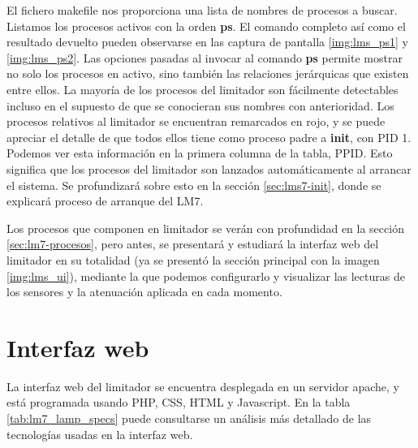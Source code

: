 El fichero \gls{makefile} nos proporciona una lista de nombres de procesos a buscar. Listamos los procesos activos con la orden \textbf{ps}. El comando completo así como el resultado devuelto pueden observarse en las captura de pantalla \ref{img:lms_ps1} y \ref{img:lms_ps2}. Las opciones pasadas al invocar al comando \textbf{ps} permite mostrar no solo los procesos en activo, sino también las relaciones jerárquicas que existen entre ellos. La mayoría de los procesos del limitador son fácilmente detectables incluso en el supuesto de que se conocieran sus nombres con anterioridad. Los procesos relativos al limitador se encuentran remarcados en rojo, y se puede apreciar el detalle de que todos ellos tiene como proceso padre  a \textbf{init}, con \acrshort{PID} 1. Podemos ver esta información en la primera columna de la tabla, \acrshort{PPID}. Esto significa que los procesos del limitador son lanzados automáticamente al arrancar el sistema. Se profundizará sobre esto en la sección \ref{sec:lms7-init}, donde se explicará proceso de arranque del LM7.

Los procesos que componen en limitador se verán con profundidad en la sección \ref{sec:lm7-procesos}, pero antes, se presentará y estudiará la interfaz web del limitador en su totalidad (ya se presentó la sección principal con la imagen \ref{img:lms_ui}), mediante la que podemos configurarlo y visualizar las lecturas de los sensores y la atenuación aplicada en cada momento.

\section{Interfaz web}

La interfaz web del limitador se encuentra desplegada en un servidor \gls{apache}, y está programada usando PHP, \acrshort{CSS}, HTML y Javascript. En la tabla \ref{tab:lm7_lamp_specs} puede consultarse un análisis más detallado de las tecnologías usadas en la interfaz web.

